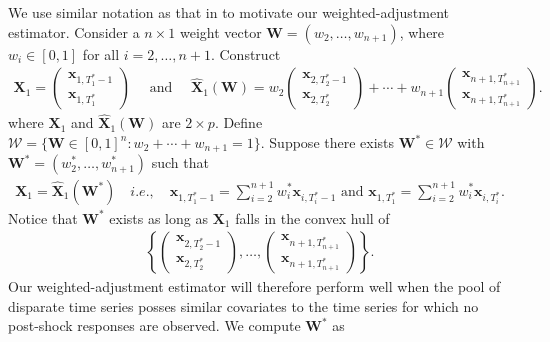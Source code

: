 \documentclass[11pt]{article}
\def\mbf#1{\mathbf{#1}} %
\def\mc#1{\mathcal{#1}} %
\theoremstyle{definition}
\begin{document}
We use similar notation as that in \cite{abadie2010synthetic} to motivate 
our weighted-adjustment estimator. Consider a $n\times 1$ weight vector 
$\mbf{W}=(w_2, \ldots, w_{n+1})$, where $w_i\in [0,1]$ for all 
$i = 2, \ldots, n+1$. Construct
\begin{align*}
 \mbf{X}_1 = \begin{pmatrix}
    \mbf{x}_{1, T_1^*-1} \\ \mbf{x}_{1, T_1^*}
  \end{pmatrix}
  \quad \text{ and }
  \quad  \hat{\mbf{X}}_1(\mbf{W})
  = w_2\begin{pmatrix}
     \mbf{x}_{2, T_2^*-1} \\
      \mbf{x}_{2, T_2^*}
   \end{pmatrix} + \cdots + w_{n+1} \begin{pmatrix}
     \mbf{x}_{n+1, T_{n+1}^*} \\
      \mbf{x}_{n+1, T_{n+1}^*}
   \end{pmatrix} .
\end{align*}
where $\mbf{X}_1$ and $\hat{\mbf{X}}_1(\mbf{W})$ are $2 \times p$. Define $\mc{W}=\{\mbf{W}\in [0,1]^n \colon w_2+ \cdots + w_{n+1}=1 \}$. 
Suppose there exists $\mbf{W}^*\in \mc{W}$ with 
$\mbf{W}^*=(w_2^*, \ldots, w_{n+1}^*)$ such that
\begin{align}
 \mbf{X}_1=\hat{\mbf{X}}_1(\mbf{W}^*)  \quad i.e., \quad \mbf{x}_{1, T_1^*-1} = \sum_{i=2}^{n+1} w_i^*\mbf{x}_{i, T_i^*-1} \text{ and } \mbf{x}_{1, T_1^*} = \sum_{i=2}^{n+1} w_i^*\mbf{x}_{i, T_i^*}.\label{SCM}
\end{align}
 Notice that $\mbf{W}^*$ exists as long as $\mbf{X}_1$ falls in the convex hull of 
 \begin{align*}
   \left\{ \begin{pmatrix}
     \mbf{x}_{2, T_2^*-1} \\
      \mbf{x}_{2, T_2^*}
   \end{pmatrix}, \ldots, \begin{pmatrix}
     \mbf{x}_{n+1, T_{n+1}^*} \\
      \mbf{x}_{n+1, T_{n+1}^*}
   \end{pmatrix} \right\}.
 \end{align*}
Our weighted-adjustment estimator will therefore perform well when the pool of 
disparate time series posses similar covariates to the time series for which 
no post-shock responses are observed. We compute $\mbf{W}^*$ as
\end{document}
